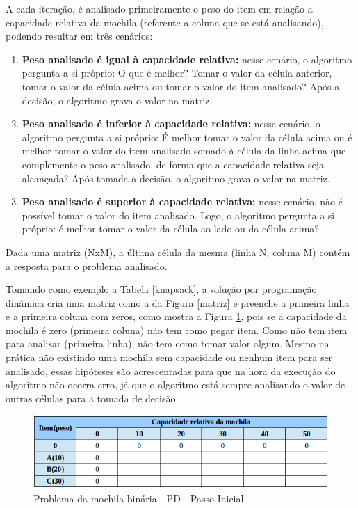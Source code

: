 \begin{itemize}
A cada iteração, é analisado primeiramente o peso do item em relação a capacidade relativa da mochila (referente a coluna que se está analisando), podendo resultar em três cenários: 
\begin{enumerate}
\item \textbf{Peso analisado é igual à capacidade relativa:} nesse cenário, o algoritmo pergunta a si próprio: O que é melhor? Tomar o valor da célula anterior, tomar o valor da célula acima ou tomar o valor do item analisado? Após a decisão, o algoritmo grava o valor na matriz.
\item \textbf{Peso analisado é inferior à capacidade relativa:} nesse cenário, o algoritmo pergunta a si próprio: É melhor tomar o valor da célula acima ou é melhor tomar o valor do item analisado somado à célula da linha acima que complemente o peso analisado, de forma que a capacidade relativa seja alcançada? Após tomada a decisão, o algoritmo grava o valor na matriz. 
\item \textbf{Peso analisado é superior à capacidade relativa:} nesse cenário, não é possível tomar o valor do item analisado. Logo, o algoritmo pergunta a si próprio: é melhor tomar o valor da célula ao lado ou da célula acima? 
\end{enumerate}

Dada uma matriz (NxM), a última célula da mesma (linha N, coluna M) contém a resposta para o problema analisado. 

Tomando como exemplo a Tabela \ref{knapsack}, a solução por programação dinâmica cria uma matriz como a da Figura \ref{matriz} e preenche a primeira linha e a primeira coluna com zeros, como mostra a Figura \ref{matrizZero}, pois se a capacidade da mochila é zero (primeira coluna) não tem como pegar item. Como não tem item para analisar (primeira linha), não tem como tomar valor algum. Mesmo na prática não existindo uma mochila sem capacidade ou nenhum item para ser analisado, essas hipóteses são acrescentadas para que na hora da execução do algoritmo não ocorra erro, já que o algoritmo está sempre analisando o valor de outras células para a tomada de decisão.

\FloatBarrier
\begin{figure}[!h]
\centering
\includegraphics[keepaspectratio=true,scale=0.5]{figuras/matrizZero.png}
\caption{Problema da mochila binária - PD - Passo Inicial}
\label{matrizZero}
\end{figure}


\end{itemize}
